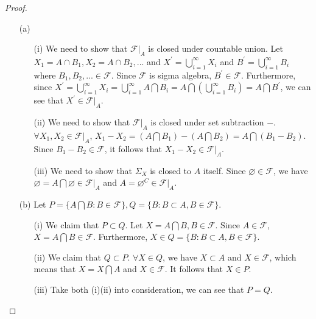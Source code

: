 \begin{proof}
    \begin{enumerate}
        \item[(a)] \begin{enumerate}
                \item[(i)] We need to show that $\mathcal{F}|_A$ is closed under countable union. Let $X_1=A\cap B_1,X_2=A\cap B_2,...$ and $X^{\prime}=\bigcup\limits^{\infty}_{i=1}X_i$ and $B^{\prime}=\bigcup\limits^{\infty}_{i=1}B_i$ where $B_1,B_2,...\in \mathcal{F}$. Since $\mathcal{F}$ is sigma algebra, $B^{\prime}\in \mathcal{F}$. Furthermore, since $X^{\prime}=\bigcup^{\infty}_{i=1}X_i=\bigcup^{\infty}_{i=1}A\bigcap B_i=A\bigcap\left(\bigcup\limits^{\infty}_{i=1}B_i \right)=A\bigcap B^{\prime}$, we can see that $X^{\prime}\in \mathcal{F}|_A$.
                \item[(ii)] We need to show that $\mathcal{F}|_A$ is closed under set subtraction $-$. $\forall X_1,X_2\in \mathcal{F}|_A$, $X_1-X_2=(A\bigcap B_1)-(A\bigcap B_2)=A\bigcap(B_1-B_2)$. Since $B_1-B_2\in \mathcal{F}$, it follows that $X_1-X_2\in \mathcal{F}|_A$.
                \item[(iii)] We need to show that $\Sigma_X$ is closed to $A$ itself. Since $\varnothing \in \mathcal{F}$, we have $\varnothing=A\bigcap\varnothing\in \mathcal{F}|_A$ and $A=\varnothing^{C}\in \mathcal{F}|_A$.
              \end{enumerate}
        \item[(b)] Let $P=\{ A\bigcap B:B\in \mathcal{F} \}, Q=\{ B: B\subset A, B\in \mathcal{F} \}$.
                \begin{enumerate}
                    \item[(i)] We claim that $P\subset Q$. Let $X=A\bigcap B, B\in \mathcal{F}$. Since $A\in \mathcal{F}$, $X=A\bigcap B\in \mathcal{F}$. Furthermore, $X\in Q=\{B:B\subset A, B\in \mathcal{F} \}$.
                    \item[(ii)] We claim that $Q\subset P$. $\forall X\in Q$, we have $X\subset A$ and $X\in \mathcal{F}$, which means that $X=X\bigcap A$ and $X\in \mathcal{F}$. It follows that $X\in P$.
                    \item[(iii)] Take both (i)(ii) into consideration, we can see that $P=Q$.
                \end{enumerate}
        \end{enumerate}
\end{proof}


